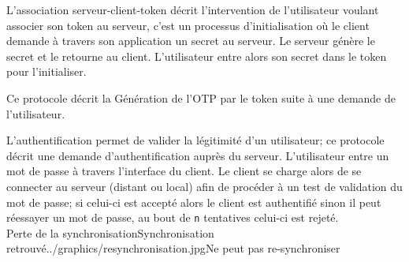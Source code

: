 \documentclass{"../../res/univ-projet"}
\begin{document}
\clearpage


\vspace{0.5cm}


L'association serveur-client-token décrit l'intervention de l'utilisateur voulant associer son token au serveur, c'est un processus d'initialisation où le client
demande à travers son application un secret au serveur. Le serveur génère le secret et le retourne au client. L'utilisateur entre alors son secret dans le token pour l'initialiser.

\vspace{1cm}



\vspace{0.5cm}


Ce protocole décrit la Génération de l'OTP par le token suite à une demande de l'utilisateur.
\\

\vspace{0.5cm}


L'authentification permet de valider la légitimité d'un utilisateur; ce protocole décrit une demande d'authentification auprès du serveur. L'utilisateur
entre un mot de passe à travers l'interface du client. Le client se charge alors de se connecter au serveur (distant ou local) afin de procéder à un test de validation du mot de passe; si celui-ci
est accepté alors le client est authentifié sinon il peut réessayer un mot de passe, au bout de \verb$n$ tentatives celui-ci est rejeté.
\\
{Perte de la synchronisation}{Synchronisation retrouvé}{../graphics/resynchronisation.jpg}{Ne peut pas re-synchroniser}
\end{document}
